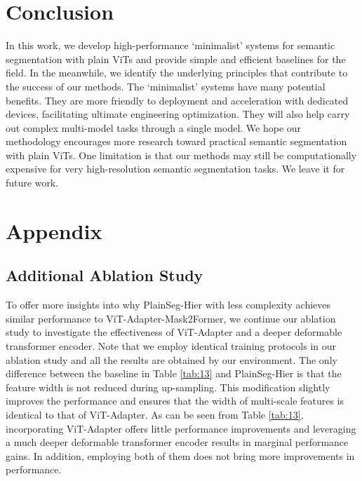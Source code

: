 \documentclass{article} \usepackage{iclr2024_conference,times}
\begin{document}
\section{Conclusion}

In this work, we develop high-performance `minimalist' systems for semantic segmentation with plain ViTs and provide simple and efficient baselines for the field. In the meanwhile, we identify the underlying principles that contribute to the success of our methods. The `minimalist' systems have many potential benefits. They are more friendly to deployment and acceleration with dedicated devices, facilitating ultimate engineering optimization. They will also help carry out complex multi-model tasks through a single model. We hope our methodology encourages more research toward practical semantic segmentation with plain ViTs. One limitation is that our methods may still be computationally expensive for very high-resolution semantic segmentation tasks. We leave it for future work.

\normalem



\clearpage
\appendix
\section{Appendix}

\iffalse
\subsection{Additional Ablation Study}


To offer more insights into why PlainSeg-Hier with less complexity achieves similar performance to ViT-Adapter-Mask2Former, we continue our ablation study to investigate the effectiveness of ViT-Adapter and a deeper deformable transformer encoder. Note that we employ identical training protocols in our ablation study and all the results are obtained by our environment. The only difference between the baseline in Table \ref{tab:13} and PlainSeg-Hier is that the feature width is not reduced during up-sampling. This modification slightly improves the performance and ensures that the width of multi-scale features is identical to that of ViT-Adapter. As can be seen from Table \ref{tab:13}, incorporating ViT-Adapter offers little performance improvements and leveraging a much deeper deformable transformer encoder results in marginal performance gains. In addition, employing both of them does not bring more improvements in performance.
\end{document}
